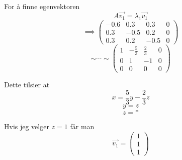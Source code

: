 For å finne egenvektoren
$$A\vec{v_1} = \lambda_1 \vec{v_1}$$
$$\implies \begin{pmatrix}
           -0.6 & 0.3 & 0.3 & 0 \\
           0.3 & -0.5 & 0.2 & 0 \\
           0.3 & 0.2 & -0.5 & 0
           \end{pmatrix}$$
$$\sim \cdots \sim \begin{pmatrix}
                1 & -\frac{5}{3} & \frac{2}{3} & 0 \\
                0 & 1 & -1 & 0 \\
                0 & 0 & 0 & 0
                \end{pmatrix}$$

Dette tilsier at
$$x = \frac{5}{3}y - \frac{2}{3}z$$
$$y = z$$
$$z = *$$

Hvis jeg velger $z = 1$ får man
$$\vec{v_1} = \begin{pmatrix}
              1 \\ 1 \\ 1
              \end{pmatrix}$$
